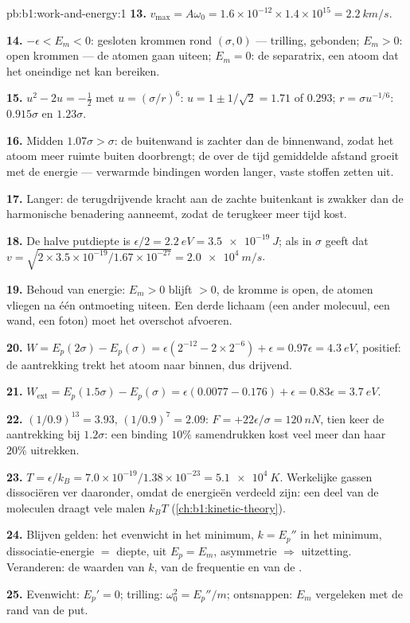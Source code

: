 \begin{solution}{pb:b1:work-and-energy:1}
\textbf{13.} $v_{\max} = A\omega_0 = 1.6\times10^{-12} \times 1.4\times10^{15}
= \qty{2.2}{km/s}$.

\textbf{14.} $-\epsilon < E_m < 0$: gesloten krommen rond $(\sigma, 0)$ ---
trilling, gebonden; $E_m > 0$: open krommen --- de atomen gaan uiteen;
$E_m = 0$: de separatrix, een atoom dat het oneindige net kan bereiken.

\textbf{15.} $u^2 - 2u = -\tfrac12$ met $u = (\sigma/r)^6$: $u = 1 \pm 1/\sqrt2
= 1.71$ of $0.293$; $r = \sigma u^{-1/6}$: $0.915\sigma$ en $1.23\sigma$.

\textbf{16.} Midden $1.07\sigma > \sigma$: de buitenwand is zachter dan
de binnenwand, zodat het atoom meer ruimte buiten doorbrengt; de over de tijd
gemiddelde afstand groeit met de energie --- verwarmde bindingen worden langer, vaste stoffen zetten uit.

\textbf{17.} Langer: de terugdrijvende kracht aan de zachte buitenkant is
zwakker dan de harmonische benadering aanneemt, zodat de terugkeer
meer tijd kost.

\textbf{18.} De halve putdiepte is $\epsilon/2 = \qty{2.2}{eV} = \qty{3.5e-19}{J}$;
als  in $\sigma$ geeft dat
$v = \sqrt{2 \times 3.5\times10^{-19}/1.67\times10^{-27}}
= \qty{2.0e4}{m/s}$.

\textbf{19.} Behoud van energie: $E_m > 0$ blijft $> 0$, de kromme is
open, de atomen vliegen na één ontmoeting uiteen. Een derde lichaam (een ander
molecuul, een wand, een foton) moet het overschot afvoeren.

\textbf{20.} $W = E_p(2\sigma) - E_p(\sigma) = \epsilon(2^{-12} - 2 \times 2^{-6})
+ \epsilon = 0.97\epsilon = \qty{4.3}{eV}$, positief: de aantrekking trekt
het atoom naar binnen, dus drijvend.

\textbf{21.} $W_{\text{ext}} = E_p(1.5\sigma) - E_p(\sigma) = \epsilon(0.0077 -
0.176) + \epsilon = 0.83\epsilon = \qty{3.7}{eV}$.

\textbf{22.} $(1/0.9)^{13} = 3.93$, $(1/0.9)^7 = 2.09$: $F = +22\epsilon/\sigma
= \qty{+120}{nN}$, tien keer de aantrekking bij $1.2\sigma$: een binding
$10\%$ samendrukken kost veel meer dan haar $20\%$ uitrekken.

\textbf{23.} $T = \epsilon/k_B = 7.0\times10^{-19}/1.38\times10^{-23} =
\qty{5.1e4}{K}$. Werkelijke gassen dissociëren ver daaronder, omdat de energieën
verdeeld zijn: een deel van de moleculen draagt vele malen $k_BT$
(\cref{ch:b1:kinetic-theory}).

\textbf{24.} Blijven gelden: het evenwicht in het minimum, $k = E_p''$ in het
minimum, dissociatie-energie $=$ diepte,  uit $E_p = E_m$,
asymmetrie $\Rightarrow$ uitzetting. Veranderen: de waarden van $k$, van de
frequentie en van de .

\textbf{25.} Evenwicht: $E_p' = 0$; trilling: $\omega_0^2 = E_p''/m$;
ontsnappen: $E_m$ vergeleken met de rand van de put.
\end{solution}
